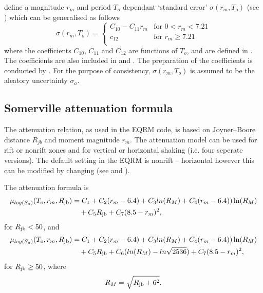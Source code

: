 \cite{dr_Sadigh97a} define a magnitude $r_m$ and period $T_o$
dependant `standard error' $\sigma(r_m,T_o)$ (see \citealt[Table
3]{dr_Sadigh97a}) which can be generalised as follows
\begin{equation}
\sigma(r_m,T_o) = \left \{ \begin{array}{ll}
C_{10}-C_{11}r_m & \textrm{for $0<r_m<7.21$} \\
c_{12} & \textrm{for $r_m \geq 7.21$} \\
\end{array} \right.
\end{equation}
where the coefficients $C_{10}$, $C_{11}$ and $C_{12}$ are
functions of $T_o$, and are defined in \cite[Table
A-14]{dr_Campbell03a}. The coefficients are also included in
 and
. The
preparation of the coefficients is conducted by
. For the purpose of
consistency, $\sigma(r_m,T_o)$ is assumed to be the aleatory
uncertainty $\sigma_a$.


\subsection{Somerville attenuation formula}
The \citet{dr_Somerville01a} attenuation relation, as used in the
EQRM code, is based on Joyner--Boore distance $R_{jb}$ and moment
magnitude $r_m$. The \citet{dr_Somerville01a} attenuation model
can be used for rift or nonrift zones and for vertical or
horizontal shaking (i.e. four seperate versions). The default
setting in the EQRM is nonrift -- horizontal however this can be
modified by changing  (see
 and ).



The attenuation formula is
\begin{equation}
\begin{split}
\mu_{log(S_a)}(T_o,r_m,\Rjb) &= C_1 + C_2(r_m-6.4) + C_3ln(R_M) + C_4(r_m-6.4))\ln(R_M) \\
       &\quad  + C_5 \Rjb+ C_7(8.5-r_m)^2,
\end{split}
\end{equation}
for $\Rjb<50$, and
\begin{equation}
\begin{split}
\mu_{log(S_a)}(T_o,r_m,\Rjb) &= C_1 + C_2(r_m-6.4) + C_3ln(R_M) + C_4(r_m-6.4))\ln(R_M) \\
       &\quad  + C_5 \Rjb + C_6(ln(R_M)-ln\sqrt{2536}) +    C_7(8.5-r_m)^2,
\end{split}
\end{equation}
for $\Rjb \geq 50$, where
\begin{equation}
 R_M = \sqrt{ \Rjb + 6^2 }.
\end{equation}

